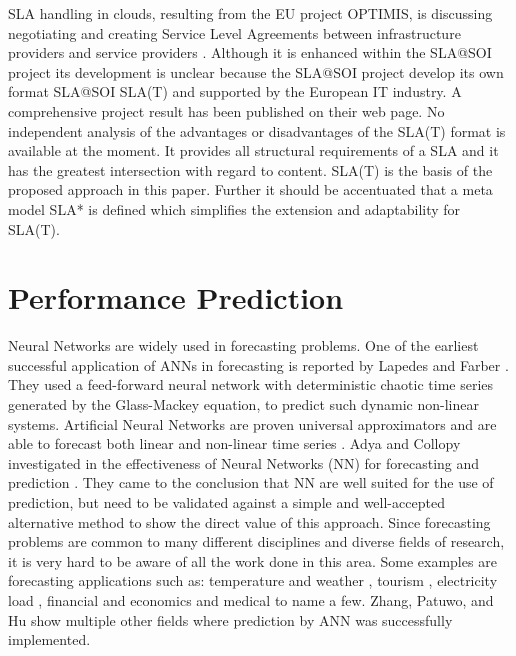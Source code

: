 SLA handling in clouds, resulting from the EU project OPTIMIS, is discussing negotiating and creating Service Level Agreements between infrastructure providers and service providers \cite{Lawrence:2010:USL:2050107.2050112}.
Although it is enhanced within the SLA@SOI project \cite{slasoi2011} its development is unclear because the SLA@SOI project develop its own format SLA@SOI SLA(T) \cite{slasoiwiki} and supported by the European IT industry. A comprehensive project result has been published on their web page. No independent analysis of the advantages or disadvantages of the SLA(T) format is available at the moment. It provides all structural requirements of a SLA and it has the greatest intersection with regard to content. SLA(T) is the basis of the proposed approach in this paper. Further it should be accentuated that a meta model SLA* \cite{slasoisrc} is defined which simplifies the extension and adaptability for SLA(T).

\section{Performance Prediction}
Neural Networks are widely used in forecasting problems. One of the earliest successful application of ANNs in forecasting is reported by Lapedes and Farber \cite{LapedesFarber87}. They used a feed-forward neural network with deterministic chaotic time series generated by the Glass-Mackey equation, to predict such dynamic non-linear systems.
Artificial Neural Networks are proven universal approximators \cite{Hornik1989359}\cite{Hornik1991251} and are able to forecast both linear \cite{Zhang20011183} and non-linear time series \cite{Zhang199835}. Adya and Collopy investigated in the effectiveness of Neural Networks (NN) for forecasting and prediction \cite{neural1}. They came to the conclusion that NN are well suited for the use of prediction, but need to be validated against a simple and well-accepted alternative method to show the direct value of this approach. Since forecasting problems are common to many different disciplines and diverse fields of research, it is very hard to be aware of all the work done in this area.  Some examples are forecasting applications such as: temperature and weather \cite{Langella2010328}\cite{Buizza}\cite{Roebber}, tourism \cite{Pattie1996151}, electricity load \cite{Park76685}\cite{Hippert910780}, financial and economics \cite{Bodyanskiy20061357}\cite{McAdam2005848}\cite{Kaastra1996215}\cite{Guresen201110389} and medical \cite{Vukicevic2014}\cite{Arizmendi20145296} to name a few. Zhang, Patuwo, and Hu \cite{Zhang199835} show multiple other fields where prediction by ANN was successfully implemented.

